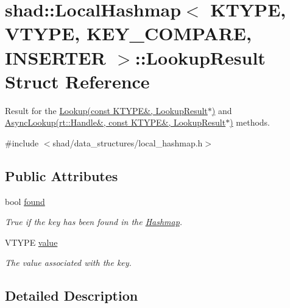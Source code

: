 \hypertarget{structshad_1_1LocalHashmap_1_1LookupResult}{\section{shad\-:\-:Local\-Hashmap$<$ K\-T\-Y\-P\-E, V\-T\-Y\-P\-E, K\-E\-Y\-\_\-\-C\-O\-M\-P\-A\-R\-E, I\-N\-S\-E\-R\-T\-E\-R $>$\-:\-:Lookup\-Result Struct Reference}
\label{structshad_1_1LocalHashmap_1_1LookupResult}
}


Result for the \hyperlink{classshad_1_1LocalHashmap_a9bd1b3780c1c676ce8d5eae265030080}{Lookup(const K\-T\-Y\-P\-E\&, Lookup\-Result$\ast$)} and \hyperlink{classshad_1_1LocalHashmap_a0328e22adb5dd53e819cc1791e802a56}{Async\-Lookup(rt\-::\-Handle\&, const K\-T\-Y\-P\-E\&, Lookup\-Result$\ast$)} methods.  




{\ttfamily \#include $<$shad/data\-\_\-structures/local\-\_\-hashmap.\-h$>$}

\subsection*{Public Attributes}
\begin{DoxyCompactItemize}
\item 
bool \hyperlink{structshad_1_1LocalHashmap_1_1LookupResult_a0298dc2b0fe9122b6b98f6a9bb62e856}{found}
\begin{DoxyCompactList}\small\item\em True if the key has been found in the \hyperlink{classshad_1_1Hashmap}{Hashmap}. \end{DoxyCompactList}\item 
V\-T\-Y\-P\-E \hyperlink{structshad_1_1LocalHashmap_1_1LookupResult_a346014daed8f0eafe5abfdd7d4f8227c}{value}
\begin{DoxyCompactList}\small\item\em The value associated with the key. \end{DoxyCompactList}\end{DoxyCompactItemize}


\subsection{Detailed Description}
